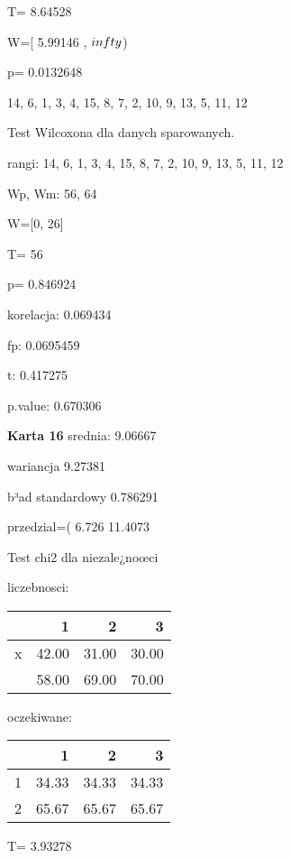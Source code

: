 \documentclass[a4paper,12pt]{article}
\begin{document}
\begin{multicols}{3}
   
   T= 8.64528 
   
   W=[ 5.99146 , $\\infty$) 
   
   p= 0.0132648 \vspace{1cm} 

  14, 6, 1, 3, 4, 15, 8, 7, 2, 10, 9, 13, 5, 11, 12 

  Test Wilcoxona dla danych sparowanych. 
  
  rangi: 14, 6, 1, 3, 4, 15, 8, 7, 2, 10, 9, 13, 5, 11, 12 
  
  Wp, Wm:  56,  64 
  
  W=[0, 26]  
  
  T=  56 
  
  p= 0.846924 \vspace{1cm} 

  korelacja: 0.069434
     
     fp: 0.0695459
     
     t: 0.417275
     
     p.value: 0.670306 \vspace{1cm} 

  \textbf{Karta  16 } 
 srednia: 9.06667 
     
     wariancja 9.27381  
     
     b³ad standardowy 0.786291 
     
     przedzial=( 6.726 11.4073 \vspace{1cm} 

  Test chi2 dla niezale¿noœci 
   
   liczebnosci: %
\begin{tabular}{rrrr}
  \hline
 & 1 & 2 & 3 \\
  \hline
x & 42.00 & 31.00 & 30.00 \\
   & 58.00 & 69.00 & 70.00 \\
   \hline
\end{tabular}
 
   
   oczekiwane: %
\begin{tabular}{rrrr}
  \hline
 & 1 & 2 & 3 \\
  \hline
1 & 34.33 & 34.33 & 34.33 \\
  2 & 65.67 & 65.67 & 65.67 \\
   \hline
\end{tabular}
 
   
   T= 3.93278 
   

\end{multicols}
\end{document}
